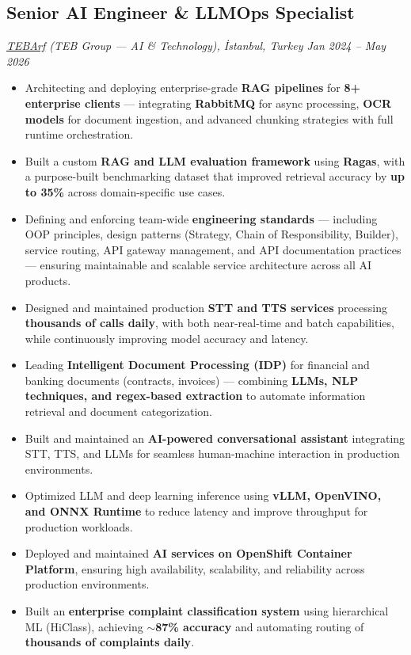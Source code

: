 \documentclass[a4paper,10pt]{article}
\begin{document}
\subsection{Senior AI Engineer \& LLMOps Specialist}
\textit{\href{https://www.tebarf.com.tr}{TEBArf} (TEB Group --- AI \& Technology), İstanbul, Turkey \hfill Jan 2024 -- May 2026}
\begin{itemize}[label=--,leftmargin=*]
    \item Architecting and deploying enterprise-grade \textbf{RAG pipelines} for \textbf{8+ enterprise clients} --- integrating \textbf{RabbitMQ} for async processing, \textbf{OCR models} for document ingestion, and advanced chunking strategies with full runtime orchestration.
    \item Built a custom \textbf{RAG and LLM evaluation framework} using \textbf{Ragas}, with a purpose-built benchmarking dataset that improved retrieval accuracy by \textbf{up to 35\%} across domain-specific use cases.
    \item Defining and enforcing team-wide \textbf{engineering standards} --- including OOP principles, design patterns (Strategy, Chain of Responsibility, Builder), service routing, API gateway management, and API documentation practices --- ensuring maintainable and scalable service architecture across all AI products.
    \item Designed and maintained production \textbf{STT and TTS services} processing \textbf{thousands of calls daily}, with both near-real-time and batch capabilities, while continuously improving model accuracy and latency.
    \item Leading \textbf{Intelligent Document Processing (IDP)} for financial and banking documents (contracts, invoices) --- combining \textbf{LLMs, NLP techniques, and regex-based extraction} to automate information retrieval and document categorization.
    \item Built and maintained an \textbf{AI-powered conversational assistant} integrating STT, TTS, and LLMs for seamless human-machine interaction in production environments.
    \item Optimized LLM and deep learning inference using \textbf{vLLM, OpenVINO, and ONNX Runtime} to reduce latency and improve throughput for production workloads.
    \item Deployed and maintained \textbf{AI services on OpenShift Container Platform}, ensuring high availability, scalability, and reliability across production environments.
    \item Built an \textbf{enterprise complaint classification system} using hierarchical ML (HiClass), achieving \textbf{$\sim$87\% accuracy} and automating routing of \textbf{thousands of complaints daily}.
\end{itemize}
\end{document}
